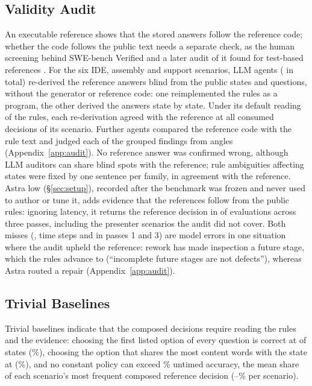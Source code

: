 \documentclass[11pt]{article}
\begin{document}
\subsection{Validity Audit}
\label{sec:audit}
An executable reference shows that the stored answers follow the reference code; whether the code follows the public text needs a separate check, as the human screening behind SWE-bench Verified and a later audit of it found for test-based references \citep{chowdhury2024introducing,openai2026why}.
For the six IDE, assembly and support scenarios, \AuditRederivationsPerScenarioWord{} LLM agents (\AuditRederivations{} in total) re-derived the reference answers blind from the public states and questions, without the generator or reference code: one reimplemented the rules as a program, the other derived the answers state by state.
Under its default reading of the rules, each re-derivation agreed with the reference at all \ReleasesPerScenario{} consumed decisions of its scenario.
Further agents compared the reference code with the rule text and judged each of the \AuditFindingGroups{} grouped findings from \AuditLensesWord{} angles (Appendix~\ref{app:audit}).
No reference answer was confirmed wrong, although LLM auditors can share blind spots with the reference; \AuditAmbiguitiesWord{} rule ambiguities affecting \AuditAffectedStates{} states were fixed by one sentence per family, in agreement with the reference.
Astra low (\S\ref{sec:setup}), recorded after the benchmark was frozen and never used to author or tune it, adds evidence that the references follow from the public rules: ignoring latency, it returns the reference decision in \AstraUntimedStates{} of \AstraStates{} evaluations across three passes, including the presenter scenarios the audit did not cover.
Both misses (\AstraMissScenarioLabel, time steps \AstraMissStep{} and \AstraMissStepPassThree{} in passes 1 and 3) are model errors in one situation where the audit upheld the reference: rework has made inspection a future stage, which the rules advance to (``incomplete future stages are not defects''), whereas Astra routed a repair (Appendix~\ref{app:audit}).

\subsection{Trivial Baselines}
\label{sec:baselines}
Trivial baselines indicate that the composed decisions require reading the rules and the evidence: choosing the first listed option of every question is correct at \BaselineFirstOptionStates{} of \NumStates{} states (\BaselineFirstOption\%), choosing the option that shares the most content words with the state at \BaselineLexicalStates{} (\BaselineLexical\%), and no constant policy can exceed \BaselineBestConstant\% untimed accuracy, the mean share of each scenario's most frequent composed reference decision (\BaselineBestConstantMin--\BaselineBestConstantMax\% per scenario).
\end{document}
